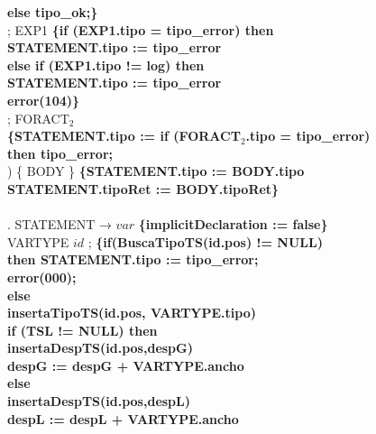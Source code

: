 \begin{tabbing}
    \>              \>          \> \textbf{else tipo\_ok;\}}\\
    \>              \> ; EXP1 \textbf{\{if (EXP1.tipo = tipo\_error) then }\\
    \>              \>          \>      \> \textbf{ STATEMENT.tipo := tipo\_error}\\
    \>              \>          \> \textbf{ else if (EXP1.tipo != log) then }\\
    \>              \>          \>      \> \textbf{STATEMENT.tipo := tipo\_error}\\
    \>              \>          \>      \> \textbf{error(104)\}}\\
    \>              \> ; FORACT$_2$\\
    \>              \>          \> \textbf{\{STATEMENT.tipo := if (FORACT$_2$.tipo = tipo\_error) }\\
    \>              \>          \>      \>\textbf{ then tipo\_error;} \\
    \>              \> ) \{ BODY \} \textbf{\{STATEMENT.tipo := BODY.tipo}\\
    \>              \>          \>\textbf{STATEMENT.tipoRet := BODY.tipoRet\}}\\
    \\
    . STATEMENT → $var$ \textbf{\{implicitDeclaration := false\}}\\
    \>              \> VARTYPE $id$ ; \textbf{\{if(BuscaTipoTS(id.pos) != NULL)} \\
    \>              \>          \>      \>\textbf{then STATEMENT.tipo := tipo\_error;}\\
    \>              \>          \>      \>\textbf{error(000);}\\
    \>              \> \textbf{ else}\\
    \>              \>          \>\textbf{insertaTipoTS(id.pos, VARTYPE.tipo)}\\
    \>              \>          \>\textbf{if (TSL != NULL) then }\\
    \>              \>          \>      \>\textbf{insertaDespTS(id.pos,despG)}\\
    \>              \>          \>      \>\textbf{despG := despG + VARTYPE.ancho}\\
    \>              \>          \>\textbf{else}\\
    \>              \>          \>      \>\textbf{insertaDespTS(id.pos,despL)}\\
    \>              \>          \>      \>\textbf{despL := despL + VARTYPE.ancho}\\

\end{tabbing}
